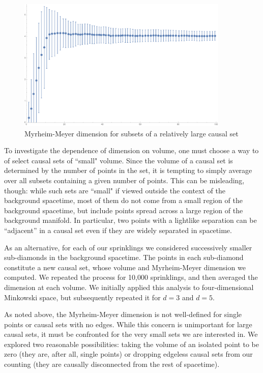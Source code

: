 \documentclass[12pt]{article}
\begin{document}
\begin{figure}
\begin{center}
\includegraphics[height=2.5in]{CSDimRedLrg.pdf}
\caption{Myrheim-Meyer dimension for subsets of a relatively large causal set \label{fig1}}
\end{center}
\end{figure}

To investigate the dependence of dimension on volume, one must choose a way to
of select causal sets of ``small" volume.  Since the volume of a causal set is
determined by the number of points in the set, it is tempting to simply average
over all subsets containing a given number of points.  This can be misleading, though:
while such sets are ``small" if viewed outside the context of the background
spacetime, most of them do not come from a small region of the background spacetime,
but include points spread across a large region of the background manifold.   In
particular, two points with a lightlike separation can be ``adjacent'' in a causal set
even if they are widely separated in spacetime.

As an alternative, for each of our sprinklings we considered successively smaller sub-diamonds
in the background spacetime.  The points in each sub-diamond constitute a new causal
set, whose volume and Myrheim-Meyer dimension we computed.  We repeated the
process for 10,000 sprinklings, and then averaged the dimension at
each volume.  We initially applied this analysis to four-dimensional Minkowski space,
but subsequently repeated it for $d=3$ and $d=5$.

As noted above, the Myrheim-Meyer dimension is not well-defined for single points or
causal sets with no edges.  While this concern is unimportant for large causal sets, it
must be confronted for the very small sets  we are interested in.  We explored
two reasonable possibilities: taking the volume of an isolated point to be zero (they are,
after all, single points) or dropping edgeless causal sets from our counting (they
are causally disconnected from the rest of spacetime).
\end{document}
